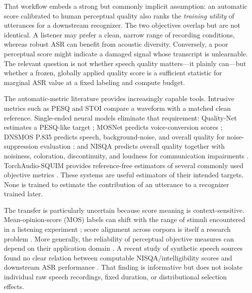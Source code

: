 \documentclass[10pt,twocolumn]{article}
\newcommand{\dns}{\textsc{DNSMOS}}
\newcommand{\squim}{\textsc{SQUIM}}
\newcommand{\asr}{\textsc{ASR}}
\begin{document}
That workflow embeds a strong but commonly implicit assumption: an automatic score calibrated to human perceptual quality also ranks the \emph{training utility} of utterances for a downstream recognizer. The two objectives overlap but are not identical. A listener may prefer a clean, narrow range of recording conditions, whereas robust \asr{} can benefit from acoustic diversity. Conversely, a poor perceptual score might indicate a damaged signal whose transcript is unlearnable. The relevant question is not whether speech quality matters---it plainly can---but whether a frozen, globally applied quality score is a sufficient statistic for marginal \asr{} value at a fixed labeling and compute budget.

The automatic-metric literature provides increasingly capable tools. Intrusive metrics such as PESQ \citep{rix2001pesq} and STOI \citep{taal2011stoi} compare a waveform with a matched clean reference. Single-ended neural models eliminate that requirement: Quality-Net estimates a PESQ-like target \citep{fu2018qualitynet}; MOSNet predicts voice-conversion scores \citep{lo2019mosnet}; \dns{} P.835 predicts speech, background-noise, and overall quality for noise-suppression evaluation \citep{reddy2022dnsmosp835}; and NISQA predicts overall quality together with noisiness, coloration, discontinuity, and loudness for communication impairments \citep{mittag2021nisqa}. TorchAudio-\squim{} provides reference-free estimators of several commonly used objective metrics \citep{kumar2023squim}. These systems are useful estimators of their intended targets. None is trained to estimate the contribution of an utterance to a recognizer trained later.

The transfer is particularly uncertain because score meaning is context-sensitive. Mean-opinion-score (MOS) labels can shift with the range of stimuli encountered in a listening experiment \citep{cooper2023range}; score alignment across corpora is itself a research problem \citep{pieper2024alignnet}. More generally, the reliability of perceptual objective measures can depend on their application domain \citep{torcoli2021domain}. A recent study of synthetic speech sources found no clear relation between computable NISQA/intelligibility scores and downstream \asr{} performance \citep{rossenbach2024ttsasr}. That finding is informative but does not isolate individual raw speech recordings, fixed duration, or distributional selection effects.
\end{document}

